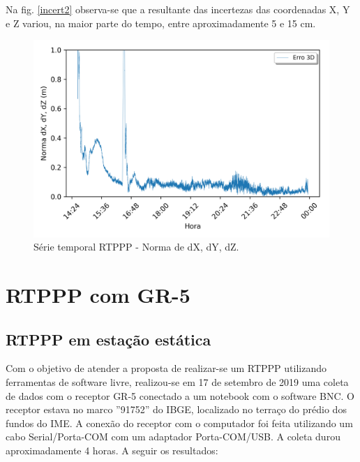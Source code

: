 Na fig. \ref{incert2} observa-se que a resultante das incertezas das coordenadas X, Y e Z variou, na maior parte do tempo, entre aproximadamente 5 e 15 cm. 

\begin{figure}[H]
\centering
\includegraphics[scale=0.9]{data/Graphics/POAL20650/POAL20650_graphic_result.png}
\caption{Série temporal RTPPP - Norma de dX, dY, dZ.}
\label{}
\end{figure}

\section{RTPPP com GR-5}
\subsection{RTPPP em estação estática}
Com o objetivo de atender a proposta de realizar-se um RTPPP utilizando ferramentas de software livre, realizou-se em 17 de setembro de 2019 uma coleta de dados com o receptor GR-5 conectado a um notebook com o software BNC. O receptor estava no marco ''91752'' do IBGE, localizado no terraço do prédio dos fundos do IME. A conexão do receptor com o computador foi feita utilizando um cabo Serial/Porta-COM com um adaptador Porta-COM/USB. A coleta durou aproximadamente 4 horas. A seguir os resultados:

